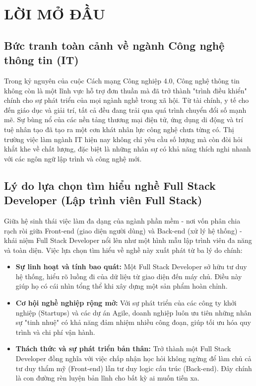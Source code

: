 \documentclass[12pt,a4paper]{article}
\begin{document}
\tableofcontents 
\clearpage

\section{LỜI MỞ ĐẦU}

\subsection{Bức tranh toàn cảnh về ngành Công nghệ thông tin (IT)}
\hspace{1cm}Trong kỷ nguyên của cuộc Cách mạng Công nghiệp 4.0, Công nghệ thông tin không còn là một lĩnh vực hỗ trợ đơn thuần mà đã trở thành "trình điều khiển" chính cho sự phát triển của mọi ngành nghề trong xã hội. Từ tài chính, y tế cho đến giáo dục và giải trí, tất cả đều đang trải qua quá trình chuyển đổi số mạnh mẽ. Sự bùng nổ của các nền tảng thương mại điện tử, ứng dụng di động và trí tuệ nhân tạo đã tạo ra một cơn khát nhân lực công nghệ chưa từng có. Thị trường việc làm ngành IT hiện nay không chỉ yêu cầu số lượng mà còn đòi hỏi khắt khe về chất lượng, đặc biệt là những nhân sự có khả năng thích nghi nhanh với các ngôn ngữ lập trình và công nghệ mới.

\subsection{Lý do lựa chọn tìm hiểu nghề Full Stack Developer (Lập trình viên Full Stack)}
\hspace{0.7cm}Giữa hệ sinh thái việc làm đa dạng của ngành phần mềm - nơi vốn phân chia rạch ròi giữa Front-end (giao diện người dùng) và Back-end (xử lý hệ thống) - khái niệm Full Stack Developer nổi lên như một hình mẫu lập trình viên đa năng và toàn diện. Việc lựa chọn tìm hiểu về nghề này xuất phát từ ba lý do chính:

\begin{itemize}
    \item \textbf{Sự linh hoạt và tính bao quát:} Một Full Stack Developer sở hữu tư duy hệ thống, hiểu rõ luồng đi của dữ liệu từ giao diện đến máy chủ. Điều này giúp họ có cái nhìn tổng thể khi xây dựng một sản phẩm hoàn chỉnh.
    \item \textbf{Cơ hội nghề nghiệp rộng mở:} Với sự phát triển của các công ty khởi nghiệp (Startups) và các dự án Agile, doanh nghiệp luôn ưu tiên những nhân sự "tinh nhuệ" có khả năng đảm nhiệm nhiều công đoạn, giúp tối ưu hóa quy trình và chi phí vận hành.
    \item \textbf{Thách thức và sự phát triển bản thân:} Trở thành một Full Stack Developer đồng nghĩa với việc chấp nhận học hỏi không ngừng để làm chủ cả tư duy thẩm mỹ (Front-end) lẫn tư duy logic cấu trúc (Back-end). Đây chính là con đường rèn luyện bản lĩnh cho bất kỳ ai muốn tiến xa.
\end{itemize}
\end{document}
